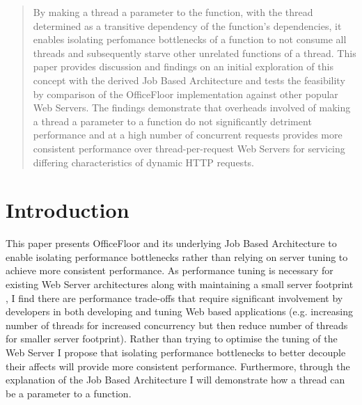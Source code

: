 \documentclass[conference]{ieee/IEEEtran}
\begin{document}
\begin{abstract}
By making a thread a parameter to the function, with the thread determined as a
transitive dependency of the function's dependencies, it enables isolating
perfomance bottlenecks of a function to not consume all threads and
subsequently starve other unrelated functions of a thread.  This paper provides
discussion and findings on an initial exploration of this concept with the
derived Job Based Architecture and tests the feasibility by comparison of the
OfficeFloor implementation against other popular Web Servers.  The findings
demonstrate that overheads involved of making a thread a parameter to a
function do not significantly detriment performance and at a high number of
concurrent requests provides more consistent performance over
thread-per-request Web Servers for servicing differing characteristics of
dynamic HTTP requests.
\end{abstract}




%
\IEEEpeerreviewmaketitle



\section{Introduction}
This paper presents OfficeFloor and its underlying Job Based Architecture to
enable isolating performance bottlenecks rather than relying on server tuning to
achieve more consistent performance. As performance tuning is necessary for
existing Web Server architectures \cite{tuning-important} along with maintaining
a small server footprint \cite{low-server-footprint}, I find there are
performance trade-offs that require significant involvement by developers in
both developing and tuning Web based applications (e.g. increasing number of
threads for increased concurrency but then reduce number of threads for smaller
server footprint).  Rather than trying to optimise the tuning of the Web Server
I propose that isolating performance bottlenecks to better decouple their
affects will provide more consistent performance.  Furthermore, through the
explanation of the Job Based Architecture I will demonstrate how a thread can be
a parameter to a function.
\end{document}
